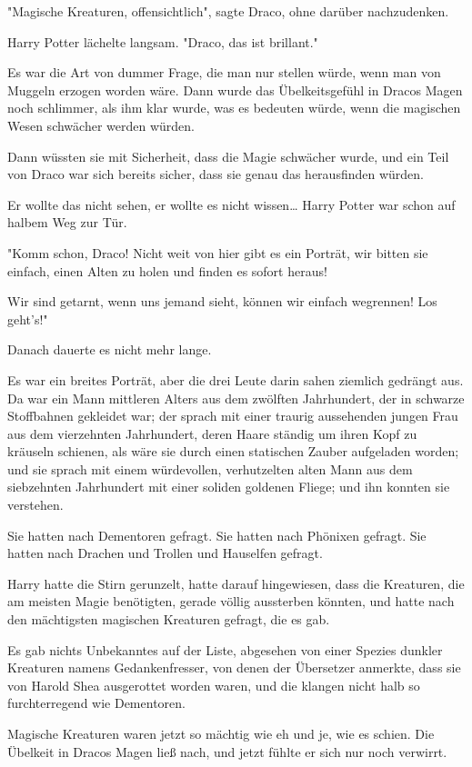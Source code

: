 {"Magische Kreaturen, offensichtlich", sagte Draco, ohne darüber nachzudenken.

Harry Potter lächelte langsam. "Draco, das ist brillant."

Es war die Art von dummer Frage, die man nur stellen würde, wenn man von Muggeln erzogen worden wäre. Dann wurde das Übelkeitsgefühl in Dracos Magen noch schlimmer, als ihm klar wurde, was es bedeuten würde, wenn die magischen Wesen schwächer werden würden.

Dann wüssten sie mit Sicherheit, dass die Magie schwächer wurde, und ein Teil von Draco war sich bereits sicher, dass sie genau das herausfinden würden.

Er wollte das nicht sehen, er wollte es nicht wissen… Harry Potter war schon auf halbem Weg zur Tür.

"Komm schon, Draco! Nicht weit von hier gibt es ein Porträt, wir bitten sie einfach, einen Alten zu holen und finden es sofort heraus!

Wir sind getarnt, wenn uns jemand sieht, können wir einfach wegrennen! Los geht's!"

Danach dauerte es nicht mehr lange.

Es war ein breites Porträt, aber die drei Leute darin sahen ziemlich gedrängt aus. Da war ein Mann mittleren Alters aus dem zwölften Jahrhundert, der in schwarze Stoffbahnen gekleidet war; der sprach mit einer traurig aussehenden jungen Frau aus dem vierzehnten Jahrhundert, deren Haare ständig um ihren Kopf zu kräuseln schienen, als wäre sie durch einen statischen Zauber aufgeladen worden; und sie sprach mit einem würdevollen, verhutzelten alten Mann aus dem siebzehnten Jahrhundert mit einer soliden goldenen Fliege; und ihn konnten sie verstehen.

Sie hatten nach Dementoren gefragt. Sie hatten nach Phönixen gefragt. Sie hatten nach Drachen und Trollen und Hauselfen gefragt.

Harry hatte die Stirn gerunzelt, hatte darauf hingewiesen, dass die Kreaturen, die am meisten Magie benötigten, gerade völlig aussterben könnten, und hatte nach den mächtigsten magischen Kreaturen gefragt, die es gab.

Es gab nichts Unbekanntes auf der Liste, abgesehen von einer Spezies dunkler Kreaturen namens Gedankenfresser, von denen der Übersetzer anmerkte, dass sie von Harold Shea ausgerottet worden waren, und die klangen nicht halb so furchterregend wie Dementoren.

Magische Kreaturen waren jetzt so mächtig wie eh und je, wie es schien. Die Übelkeit in Dracos Magen ließ nach, und jetzt fühlte er sich nur noch verwirrt.

}
